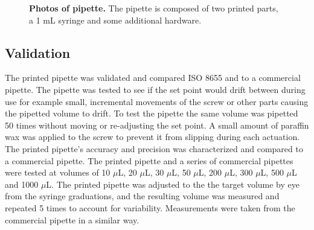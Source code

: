 \documentclass[10pt,letterpaper]{article}
\begin{document}
\begin{figure}
\caption{
{\bf Photos of pipette.}  The pipette is composed of two printed parts, a 1 mL syringe and some additional hardware.  
}
\label{fig3}
\end{figure}

\subsection*{Validation}
The printed pipette was validated and compared ISO 8655 and to a commercial pipette. 
The pipette was tested to see if the set point would drift between during use for example small, incremental movements of the screw or other parts causing the pipetted volume to drift.
To test the pipette the same volume was pipetted 50 times without moving or re-adjusting the set point.
A small amount of paraffin wax was applied to the screw to prevent it from slipping during each actuation. 
The printed pipette’s accuracy and precision was characterized and compared to a commercial pipette.
The printed pipette and a series of commercial pipettes were tested at volumes of 10 $\mu$L, 20 $\mu$L, 30 $\mu$L, 50 $\mu$L, 200 $\mu$L, 300 $\mu$L, 500 $\mu$L and 1000 $\mu$L. 
The printed pipette was adjusted to the the target volume by eye from the syringe graduations, and the resulting volume was measured and repeated 5 times to account for variability.
Measurements were taken from the commercial pipette in a similar way.



\end{document}

